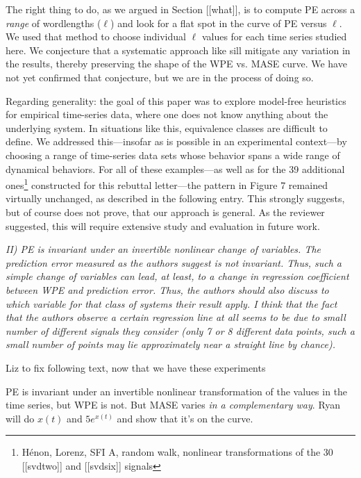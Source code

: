 \documentclass[12pt]{article}
\newcommand{\alert}[1]{{\color{red}#1}}
\begin{document}
The right thing to do, as we argued in Section [[what]], is to compute
PE across a \emph{range} of wordlengths ($\ell$) and look for a flat
spot in the curve of PE versus $\ell$.  We used that method to choose
individual $\ell$ values for each time series studied here.  We
conjecture that a systematic approach like sill mitigate any variation
in the results, thereby preserving the shape of the WPE vs. MASE
curve.  We have not yet confirmed that conjecture, but we are in the
process of doing so.

Regarding generality: the goal of this paper was to explore model-free
heuristics for empirical time-series data, where one does not know
anything about the underlying system.  In situations like this,
equivalence classes are difficult to define.  We addressed
this---insofar as is possible in an experimental context---by choosing
a range of time-series data sets whose behavior spans a wide range of
dynamical behaviors.  For all of these examples---as well as for the
39 additional ones\footnote{H\'{e}non, Lorenz, SFI A, random walk,
  nonlinear transformations of the 30 [[svdtwo]] and [[svdsix]]
  signals} constructed for this rebuttal letter---the pattern in
Figure 7 remained virtually unchanged, as described in the following
entry.  This strongly suggests, but of course does not prove, that our
approach is general.  As the reviewer suggested, this will require
extensive study and evaluation in future work.

\smallskip

\emph{II) PE is invariant under an invertible nonlinear change of
  variables. The prediction error measured as the authors suggest is
  not invariant. Thus, such a simple change of variables can lead, at
  least, to a change in regression coefficient between WPE and
  prediction error. Thus, the authors should also discuss to which
  variable for that class of systems their result apply. I think that
  the fact that the authors observe a certain regression line at all
  seems to be due to small number of different signals they consider
  (only 7 or 8 different data points, such a small number of points
  may lie approximately near a straight line by chance).}

\alert{Liz to fix following text, now that we have these experiments}

PE is invariant under an invertible nonlinear transformation of the
values in the time series, but WPE is not.  But MASE varies \emph{in a
  complementary way}.  Ryan will do $x(t)$ and $5e^{x(t)}$ and show
that it's on the curve.
\end{document}
